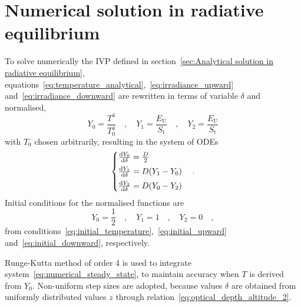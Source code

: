 \documentclass[a4paper,10pt,twocolumn,\classoptions]{article}
\begin{document}
\section{Numerical solution in radiative equilibrium}
\label{sec:Numerical solution in radiative equilibrium}
To solve numerically the IVP defined in section~\ref{sec:Analytical solution in radiative equilibrium}, equations~\eqref{eq:temperature_analytical},~\eqref{eq:irradiance_upward} and~\eqref{eq:irradiance_downward} are rewritten in terms of variable $\delta$ and normalised,
\begin{equation}
  \label{eq:normalisation}
  Y_0 = \frac{T^4}{T_0^4}
  \quad , \quad
  Y_1 = \frac{E_\text{U}}{S_\text{t}}
  \quad , \quad
  Y_2 = \frac{E_\text{U}}{S_\text{t}}
\end{equation}
with $T_0$ chosen arbitrarily, resulting in the system of ODEs
\begin{equation}
  \label{eq:numerical_steady_state}
  \left\{
  \begin{array}{@{}l@{}}
    \odv{Y_0}{\delta} = \frac{D}{2} \\[0.5em]
    \odv{Y_1}{\delta} = D (Y_1 - Y_0) \\[0.5em]
    \odv{Y_2}{\delta} = D (Y_0 - Y_2)
  \end{array}
  \right.
  \quad .
\end{equation}
Initial conditions for the normalised functions are
\begin{equation}
  \label{eq:initial_normalisation}
  Y_0 = \frac{1}{2}
  \quad , \quad
  Y_1 = 1
  \quad , \quad
  Y_2 = 0
  \quad ,
\end{equation}
from conditions~\eqref{eq:initial_temperature},~\eqref{eq:initial_upward} and~\eqref{eq:initial_downward}, respectively.

Runge-Kutta method of order 4 is used to integrate system~\eqref{eq:numerical_steady_state}, to maintain accuracy when $T$ is derived from $Y_0$. Non-uniform step sizes are adopted, because values $\delta$ are obtained from uniformly distributed values $z$ through relation~\eqref{eq:optical_depth_altitude_2}.
\end{document}
